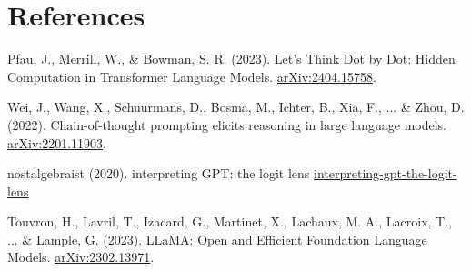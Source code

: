 \documentclass[10pt,a4paper]{article}
\begin{document}
\clearpage
\section{References}

\begin{thebibliography}{9}

Pfau, J., Merrill, W., \& Bowman, S. R. (2023). Let's Think Dot by Dot: Hidden Computation in Transformer Language Models. \href{https://arxiv.org/abs/2404.15758}{arXiv:2404.15758}.

Wei, J., Wang, X., Schuurmans, D., Bosma, M., Ichter, B., Xia, F., ... \& Zhou, D. (2022). Chain-of-thought prompting elicits reasoning in large language models. \href{https://arxiv.org/abs/2201.11903}{arXiv:2201.11903}.

nostalgebraist (2020). interpreting GPT: the logit lens \href{https://www.lesswrong.com/posts/AcKRB8wDpdaN6v6ru/}{interpreting-gpt-the-logit-lens}

Touvron, H., Lavril, T., Izacard, G., Martinet, X., Lachaux, M. A., Lacroix, T., ... \& Lample, G. (2023). LLaMA: Open and Efficient Foundation Language Models. \href{https://arxiv.org/abs/2302.13971}{arXiv:2302.13971}.

\end{thebibliography}
\end{document}
